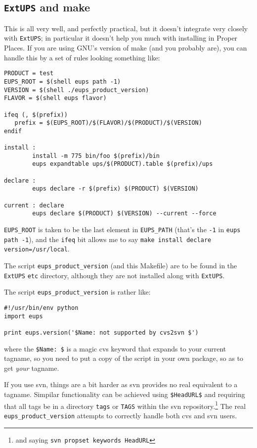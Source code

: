\documentclass{article}
\newcommand{\code}[1]{\texttt{#1}}
\newcommand{\eups}{\code{ExtUPS}}
\begin{document}
\subsection{\eups{} and make}

This is all very well, and perfectly practical, but it doesn't
integrate very closely with \eups{}; in particular it doesn't
help you much with installing in Proper Places. If you are
using GNU's version of make (and you probably are), you can handle
this by a set of rules looking something like:
\begin{verbatim}
PRODUCT = test
EUPS_ROOT = $(shell eups path -1)
VERSION = $(shell ./eups_product_version)
FLAVOR = $(shell eups flavor)

ifeq (, $(prefix))
   prefix = $(EUPS_ROOT)/$(FLAVOR)/$(PRODUCT)/$(VERSION)
endif

install :
        install -m 775 bin/foo $(prefix)/bin
        eups expandtable ups/$(PRODUCT).table $(prefix)/ups

declare :
        eups declare -r $(prefix) $(PRODUCT) $(VERSION)
        
current : declare
        eups declare $(PRODUCT) $(VERSION) --current --force
\end{verbatim}                          %

\code{EUPS\_ROOT} is taken to be the last element in \code{EUPS\_PATH} (that's
the \code{-1} in \code{eups path -1}),
and the \code{ifeq} bit allows me to say \code{make install declare version=/usr/local}.

The script \code{eups\_product\_version} (and this Makefile) are to be found
in the \eups{} \code{etc} directory, although they are not installed along
with \eups{}.

The script \code{eups\_product\_version} is rather like:
\begin{verbatim}
#!/usr/bin/env python
import eups

print eups.version('$Name: not supported by cvs2svn $')
\end{verbatim}
\def\Name{Name}
where the \code{\$\Name:  \$} is a magic cvs keyword that expands to your
current tagname, so you need to put a copy of the script in your own
package, so as to get \emph{your} tagname.

If you use svn, things are a bit harder as svn provides no real
equivalent to a tagname. Simpilar functionality can be achieved using \code{\$HeadURL\$}
and requiring that all tags be in a directory \code{tags}
or \code{TAGS} within the svn repository.\footnote{
  and saying \code{svn propset keywords HeadURL}}
The real \code{eups\_product\_version} attempts to correctly handle both cvs
and svn users.
\end{document}
